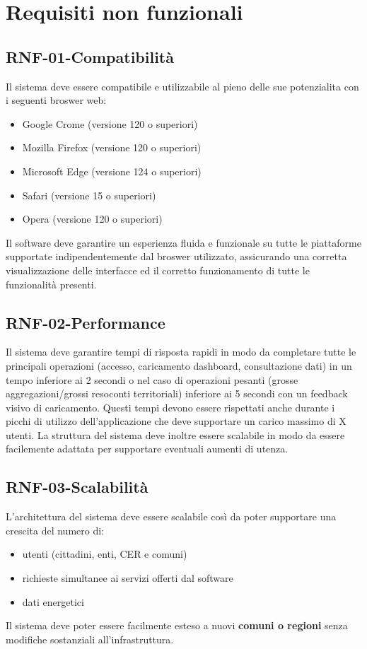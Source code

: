 \setcounter{section}{1}
\setlength{\parindent}{0pt}  %
\setlength{\parskip}{6pt}
\section{Requisiti non funzionali}
\subsection*{RNF-01-Compatibilità}
Il sistema deve essere compatibile e utilizzabile al pieno delle sue potenzialita
con i seguenti broswer web:
\begin{itemize}
    \item Google Crome (versione 120 o superiori)
    \item Mozilla Firefox (versione 120 o superiori)
    \item Microsoft Edge (versione 124 o superiori)
    \item Safari (versione 15 o superiori)
    \item Opera (versione 120 o superiori)
\end{itemize}
Il software deve garantire un esperienza fluida e funzionale su tutte le
piattaforme supportate indipendentemente dal broswer utilizzato, assicurando
una corretta visualizzazione delle interfacce ed il corretto
funzionamento di tutte le funzionalità presenti.
\subsection*{RNF-02-Performance}
Il sistema deve garantire tempi di risposta rapidi in modo da completare
tutte le principali operazioni (accesso, caricamento dashboard, consultazione dati)
in un tempo inferiore ai 2 secondi o nel caso di operazioni pesanti (grosse aggregazioni/grossi resoconti territoriali)
inferiore ai 5 secondi con un feedback visivo di caricamento.
Questi tempi devono essere rispettati anche durante i picchi di utilizzo dell'applicazione
che deve supportare un carico massimo di X utenti. La struttura del sistema deve 
inoltre essere scalabile in modo da essere facilemente adattata per supportare eventuali
aumenti di utenza.
\subsection*{RNF-03-Scalabilità}
L'architettura del sistema deve essere scalabile così da poter supportare una crescita
del numero di:
\begin{itemize}
    \item utenti (cittadini, enti, CER e comuni)
    \item richieste simultanee ai servizi offerti dal software
    \item dati energetici
\end{itemize}
Il sistema deve poter essere facilmente esteso a nuovi \textbf{comuni o regioni} senza modifiche
sostanziali all'infrastruttura.
